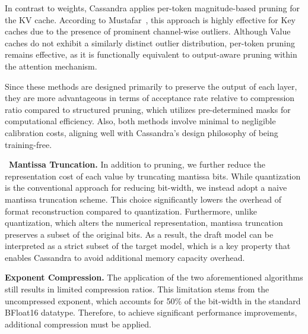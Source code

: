In contrast to weights, Cassandra applies per-token magnitude-based pruning for the KV cache. According to Mustafar~\cite{Mustafar}, this approach is highly effective for Key caches due to the presence of prominent channel-wise outliers. Although Value caches do not exhibit a similarly distinct outlier distribution, per-token pruning remains effective, as it is functionally equivalent to output-aware pruning within the attention mechanism.

Since these methods are designed primarily to preserve the output of each layer, they are more advantageous in terms of acceptance rate relative to compression ratio compared to structured pruning, which utilizes pre-determined masks for computational efficiency. Also, both methods involve minimal to negligible calibration costs, aligning well with Cassandra's design philosophy of being training-free.

~\textbf{Mantissa Truncation.} In addition to pruning, we further reduce the representation cost of each value by truncating mantissa bits. While quantization is the conventional approach for reducing bit-width, we instead adopt a naive mantissa truncation scheme. This choice significantly lowers the overhead of format reconstruction compared to quantization. Furthermore, unlike quantization, which alters the numerical representation, mantissa truncation preserves a subset of the original bits. As a result, the draft model can be interpreted as a strict subset of the target model, which is a key property that enables Cassandra to avoid additional memory capacity overhead.


\textbf{Exponent Compression.} The application of the two aforementioned algorithms still results in limited compression ratios. This limitation stems from the uncompressed exponent, which accounts for 50\% of the bit-width in the standard BFloat16 datatype. Therefore, to achieve significant performance improvements, additional compression must be applied.

